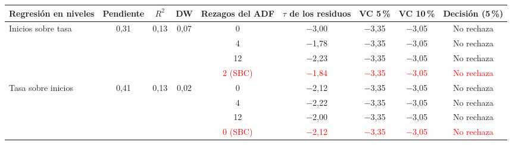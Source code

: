 \begin{tabular}{lcccccccc}
\toprule
Regresi\'on en niveles & Pendiente & $R^2$ & DW & Rezagos del ADF & $\tau$ de los residuos & VC 5\,\% & VC 10\,\% & Decisi\'on (5\,\%)
\\ \midrule
Inicios sobre tasa & 0{,}31 & 0{,}13 & 0{,}07 & 0 & \ensuremath{-}3{,}00 & \ensuremath{-}3{,}35 & \ensuremath{-}3{,}05 & No rechaza \\
 &  &  &  & 4 & \ensuremath{-}1{,}78 & \ensuremath{-}3{,}35 & \ensuremath{-}3{,}05 & No rechaza \\
 &  &  &  & 12 & \ensuremath{-}2{,}23 & \ensuremath{-}3{,}35 & \ensuremath{-}3{,}05 & No rechaza \\
 &  &  &  & \textcolor{red}{2 (SBC)} & \textcolor{red}{\ensuremath{-}1{,}84} & \textcolor{red}{\ensuremath{-}3{,}35} & \textcolor{red}{\ensuremath{-}3{,}05} & \textcolor{red}{No rechaza} \\
Tasa sobre inicios & 0{,}41 & 0{,}13 & 0{,}02 & 0 & \ensuremath{-}2{,}12 & \ensuremath{-}3{,}35 & \ensuremath{-}3{,}05 & No rechaza \\
 &  &  &  & 4 & \ensuremath{-}2{,}22 & \ensuremath{-}3{,}35 & \ensuremath{-}3{,}05 & No rechaza \\
 &  &  &  & 12 & \ensuremath{-}2{,}00 & \ensuremath{-}3{,}35 & \ensuremath{-}3{,}05 & No rechaza \\
 &  &  &  & \textcolor{red}{0 (SBC)} & \textcolor{red}{\ensuremath{-}2{,}12} & \textcolor{red}{\ensuremath{-}3{,}35} & \textcolor{red}{\ensuremath{-}3{,}05} & \textcolor{red}{No rechaza} \\
\bottomrule
\end{tabular}
